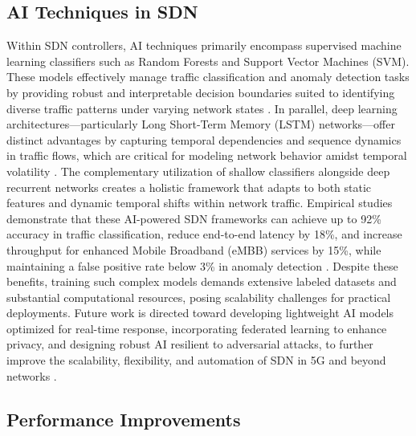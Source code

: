 \documentclass[sigconf]{acmart}
\begin{document}
\subsection{AI Techniques in SDN}

Within SDN controllers, AI techniques primarily encompass supervised machine learning classifiers such as Random Forests and Support Vector Machines (SVM). These models effectively manage traffic classification and anomaly detection tasks by providing robust and interpretable decision boundaries suited to identifying diverse traffic patterns under varying network states \cite{ref52}. In parallel, deep learning architectures—particularly Long Short-Term Memory (LSTM) networks—offer distinct advantages by capturing temporal dependencies and sequence dynamics in traffic flows, which are critical for modeling network behavior amidst temporal volatility \cite{ref52}. The complementary utilization of shallow classifiers alongside deep recurrent networks creates a holistic framework that adapts to both static features and dynamic temporal shifts within network traffic. Empirical studies demonstrate that these AI-powered SDN frameworks can achieve up to 92\% accuracy in traffic classification, reduce end-to-end latency by 18\%, and increase throughput for enhanced Mobile Broadband (eMBB) services by 15\%, while maintaining a false positive rate below 3\% in anomaly detection \cite{ref52}. Despite these benefits, training such complex models demands extensive labeled datasets and substantial computational resources, posing scalability challenges for practical deployments. Future work is directed toward developing lightweight AI models optimized for real-time response, incorporating federated learning to enhance privacy, and designing robust AI resilient to adversarial attacks, to further improve the scalability, flexibility, and automation of SDN in 5G and beyond networks \cite{ref52}.

\subsection{Performance Improvements}
\end{document}
